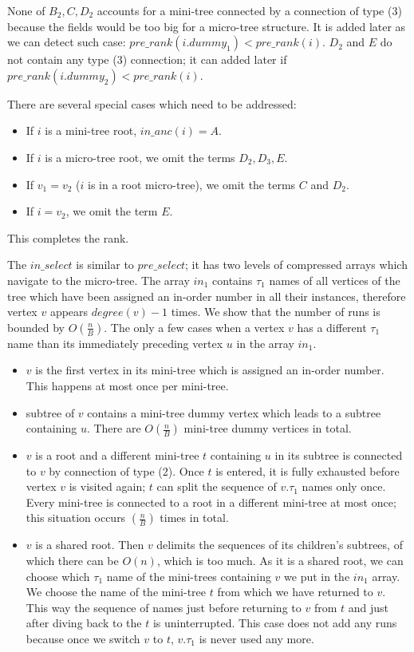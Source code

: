 None of $B_2, C, D_2$ accounts for a mini-tree connected by a connection of type (3) because the fields would be too big for a micro-tree structure.
It is added later as we can detect such case: $pre\_rank(i.dummy_1) < pre\_rank(i)$.
$D_2$ and $E$ do not contain any type (3) connection; it can added later if $pre\_rank(i.dummy_2) < pre\_rank(i)$.

There are several special cases which need to be addressed:
\begin{itemize}
	\item If $i$ is a mini-tree root, $in\_anc(i) = A$.
	\item If $i$ is a micro-tree root, we omit the terms $D_2, D_3, E$.
	\item If $v_1 = v_2$ ($i$ is in a root micro-tree), we omit the terms $C$ and $D_2$.
	\item If $i = v_2$, we omit the term $E$.
\end{itemize}

This completes the rank.

The $in\_select$ is similar to $pre\_select$; it has two levels of compressed arrays which navigate to the micro-tree.
The array $in_1$ contains $\tau_1$ names of all vertices of the tree which have been assigned an in-order number in all their instances, therefore vertex $v$ appears $degree(v) - 1$ times.
We show that the number of runs is bounded by $O(\frac{n}{B})$.
The only a few cases when a vertex $v$ has a different $\tau_1$ name than its immediately preceding vertex $u$ in the array $in_1$.
\begin{itemize}
	\item $v$ is the first vertex in its mini-tree which is assigned an in-order number.
	This happens at most once per mini-tree.
	\item subtree of $v$ contains a mini-tree dummy vertex which leads to a subtree containing $u$.
	There are $O(\frac{n}{B})$ mini-tree dummy vertices in total.
	\item $v$ is a root and a different mini-tree $t$ containing $u$ in its subtree is connected to $v$ by connection of type (2).
	Once $t$ is entered, it is fully exhausted before vertex $v$ is visited again; $t$ can split the sequence of $v.\tau_1$ names only once.
	Every mini-tree is connected to a root in a different mini-tree at most once; this situation occurs $(\frac{n}{B})$ times in total.
	\item $v$ is a shared root.
	Then $v$ delimits the sequences of its children's subtrees, of which there can be $O(n)$, which is too much.
	As it is a shared root, we can choose which $\tau_1$ name of the mini-trees containing $v$ we put in the $in_1$ array.
	We choose the name of the mini-tree $t$ from which we have returned to $v$.
	This way the sequence of names just before returning to $v$ from $t$ and just after diving back to the $t$ is uninterrupted.
	This case does not add any runs because once we switch $v$ to $t$, $v.\tau_1$ is never used any more.
\end{itemize}

